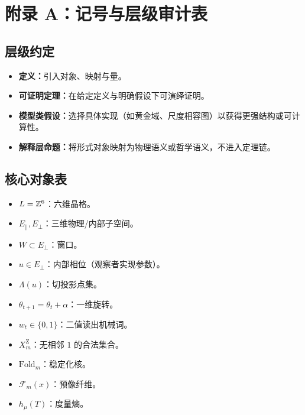 \section{附录 A：记号与层级审计表}
\label{app:audit-table}

\subsection{层级约定}

\begin{itemize}
  \item \textbf{定义：}引入对象、映射与量。
  \item \textbf{可证明定理：}在给定定义与明确假设下可演绎证明。
  \item \textbf{模型类假设：}选择具体实现（如黄金域、尺度相容图）以获得更强结构或可计算性。
  \item \textbf{解释层命题：}将形式对象映射为物理语义或哲学语义，不进入定理链。
\end{itemize}

\subsection{核心对象表}

\begin{itemize}
  \item $L=\mathbb{Z}^6$：六维晶格。
  \item $E_{\parallel},E_{\perp}$：三维物理/内部子空间。
  \item $W\subset E_{\perp}$：窗口。
  \item $u\in E_{\perp}$：内部相位（观察者实现参数）。
  \item $\Lambda(u)$：切投影点集。
  \item $\theta_{t+1}=\theta_t+\alpha$：一维旋转。
  \item $w_t\in\{0,1\}$：二值读出机械词。
  \item $X_m^{\mathrm Z}$：无相邻 $1$ 的合法集合。
  \item $\mathrm{Fold}_m$：稳定化核。
  \item $\mathcal{F}_m(x)$：预像纤维。
  \item $h_\mu(T)$：度量熵。
\end{itemize}

